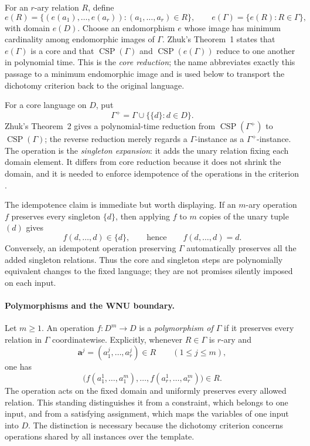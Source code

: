 For an \(r\)-ary relation \(R\), define
\[
 e(R)=\{(e(a_1),\ldots,e(a_r)):(a_1,\ldots,a_r)\in R\},
 \qquad
 e(\Gamma)=\{e(R):R\in\Gamma\},
\]
with domain \(e(D)\).  Choose an endomorphism \(e\) whose image has minimum
cardinality among endomorphic images of \(\Gamma\).  Zhuk's Theorem~1 states
that \(e(\Gamma)\) is a core and that
\(\operatorname{CSP}(\Gamma)\) and
\(\operatorname{CSP}(e(\Gamma))\) reduce to one another in polynomial time.
This is the \emph{core reduction}; the name abbreviates exactly this passage to
a minimum endomorphic image and is used below to transport the dichotomy
criterion back to the original language.

For a core language on \(D\), put
\[
 \Gamma^+=\Gamma\cup\bigl\{\{d\}:d\in D\bigr\}.
\]
Zhuk's Theorem~2 gives a polynomial-time reduction from
\(\operatorname{CSP}(\Gamma^+)\) to \(\operatorname{CSP}(\Gamma)\); the
reverse reduction merely regards a \(\Gamma\)-instance as a
\(\Gamma^+\)-instance.  The operation is the \emph{singleton expansion}: it
adds the unary relation fixing each domain element.  It differs from core
reduction because it does not shrink the domain, and it is needed to enforce
idempotence of the operations in the criterion
\cite[pp.~331--332, thms.~1--2]{Zhuk2017}.

The idempotence claim is immediate but worth displaying.  If an \(m\)-ary
operation \(f\) preserves every singleton \(\{d\}\), then applying \(f\) to
\(m\) copies of the unary tuple \((d)\) gives
\[
 f(d,\ldots,d)\in\{d\},
 \qquad\text{hence}\qquad
 f(d,\ldots,d)=d.
\]
Conversely, an idempotent operation preserving \(\Gamma\) automatically
preserves all the added singleton relations.  Thus the core and singleton
steps are polynomially equivalent changes to the fixed language; they are not
promises silently imposed on each input.

\paragraph{Polymorphisms and the WNU boundary.}
Let \(m\geq1\).  An operation \(f:D^m\to D\) is a
\emph{polymorphism of \(\Gamma\)} if it preserves every relation in
\(\Gamma\) coordinatewise.  Explicitly, whenever \(R\in\Gamma\) is
\(r\)-ary and
\[
 \mathbf a^j=(a^j_1,\ldots,a^j_r)\in R
 \qquad(1\leq j\leq m),
\]
one has
\[
 \bigl(f(a^1_1,\ldots,a^m_1),\ldots,
        f(a^1_r,\ldots,a^m_r)\bigr)\in R.
\]
The operation acts on the fixed domain and uniformly preserves every allowed
relation.  This standing distinguishes it from a constraint, which belongs to
one input, and from a satisfying assignment, which maps the variables of one
input into \(D\).  The distinction is necessary because the dichotomy
criterion concerns operations shared by all instances over the template.

